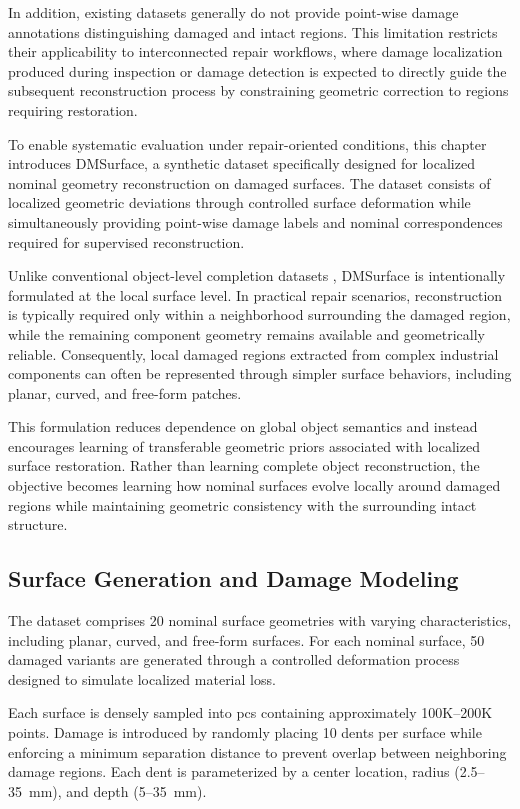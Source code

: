 In addition, existing datasets generally do not provide point-wise damage annotations distinguishing damaged and intact regions. This limitation restricts their applicability to interconnected repair workflows, where damage localization produced during inspection or damage detection is expected to directly guide the subsequent reconstruction process by constraining geometric correction to regions requiring restoration.

To enable systematic evaluation under repair-oriented conditions, this chapter introduces DMSurface, a synthetic dataset specifically designed for localized nominal geometry reconstruction on damaged surfaces. The dataset consists of localized geometric deviations through controlled surface deformation while simultaneously providing point-wise damage labels and nominal correspondences required for supervised reconstruction.

Unlike conventional object-level completion datasets \cite{Chang2015}, DMSurface is intentionally formulated at the local surface level. In practical repair scenarios, reconstruction is typically required only within a neighborhood surrounding the damaged region, while the remaining component geometry remains available and geometrically reliable. Consequently, local damaged regions extracted from complex industrial components can often be represented through simpler surface behaviors, including planar, curved, and free-form patches.

This formulation reduces dependence on global object semantics and instead encourages learning of transferable geometric priors associated with localized surface restoration. Rather than learning complete object reconstruction, the objective becomes learning how nominal surfaces evolve locally around damaged regions while maintaining geometric consistency with the surrounding intact structure.

\subsection{Surface Generation and Damage Modeling}

The dataset comprises 20 nominal surface geometries with varying characteristics, including planar, curved, and free-form surfaces. For each nominal surface, 50 damaged variants are generated through a controlled deformation process designed to simulate localized material loss.

Each surface is densely sampled into \acp{pc} containing approximately 100K--200K points. Damage is introduced by randomly placing 10 dents per surface while enforcing a minimum separation distance to prevent overlap between neighboring damage regions. Each dent is parameterized by a center location, radius (2.5--35~mm), and depth (5--35~mm).

